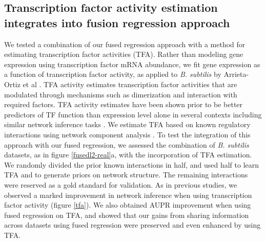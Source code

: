 \documentclass[11pt]{article}
\begin{document}
\subsection{Transcription factor activity estimation integrates into fusion regression approach}
We tested a combination of our fused regression approach with a method for estimating transcription factor activities (TFA). 
Rather than modeling gene expression using transcription factor mRNA abundance, we fit gene expression as a function of transcription factor activity, as applied to \textit{B. subtilis} by Arrieta-Ortiz et al \cite{arrieta-ortiz_experimentally_2015}. 
TFA activity estimates  transcription factor activities that are modulated through mechanisms such as dimerization and interaction with required factors.
TFA activity estimates have been shown prior to be better predictors of TF function than expression level alone in several contexts including similar network inference tasks\cite{fu_reconstructing_2011} \cite{arrieta-ortiz_experimentally_2015}. 
We estimate TFA based on known regulatory interactions using network component analysis \cite{liao2003network}.
To test the integration of this approach with our fused regression, we assessed the combination of \textit{B. subtilis} datasets, as in figure \ref{fusedl2-real}a, with the incorporation of TFA estimation. 
We randomly divided the prior known interactions in half, and used half to learn TFA and to generate priors on network structure. 
The remaining interactions were reserved as a gold standard for validation. 
As in previous studies, we observed a marked improvement in network inference when using transcription factor activity (figure \ref{tfa}). 
We also obtained AUPR improvement when using fused regression on TFA, and showed that our gains from sharing information across datasets using fused regression were preserved and even enhanced by using TFA. 
\end{document}
